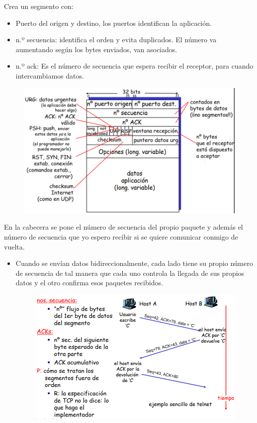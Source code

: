 \documentclass[12pt, twoside, openright]{report} %
\begin{document}
	Crea un segmento con:

    \begin{itemize}
    \item
      Puerto del origen y destino, los puertos identifican la
      aplicación.
    \item
      n.º secuencia: identifica el orden y evita duplicados. El número va
      aumentando según los bytes enviados, van asociados.
    \item
      n.º ack: Es el número de secuencia que espera recibir el receptor,
      para cuando intercambiamos datos.
    \end{itemize}
	\begin{figure}[H]
		{\includegraphics[scale=.4]{Untitled 4.png}}
	\end{figure}
	\pagebreak
	En la cabecera se pone el número de secuencia del propio paquete y
    además el número de secuencia que yo espero recibir si se quiere
    comunicar conmigo de vuelta.

    \begin{itemize}
    \item
      Cuando se envían datos bidireccionalmente, cada lado tiene su
      propio número de secuencia de tal manera que cada uno controla la
      llegada de sus propios datos y el otro confirma esos paquetes
      recibidos.
	  \begin{figure}[H]
		{\includegraphics[scale=.45]{Untitled 5.png}}
	\end{figure}
    \end{itemize}
\end{document}
